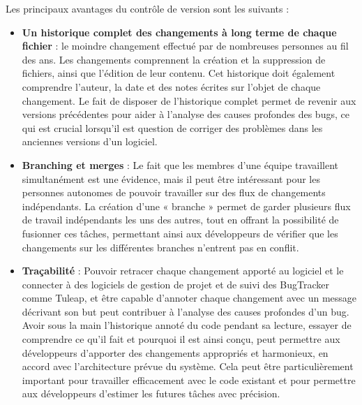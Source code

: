 Les principaux avantages du contrôle de version sont les suivants :
\begin{itemize}
   \item \textbf{Un historique complet des changements à long terme de chaque fichier} : le moindre changement effectué par de nombreuses personnes au fil des ans. Les changements comprennent la création et la suppression de fichiers, ainsi que l'édition de leur contenu. Cet historique doit également comprendre l'auteur, la date et des notes écrites sur l'objet de chaque changement. Le fait de disposer de l'historique complet permet de revenir aux versions précédentes pour aider à l'analyse des causes profondes des bugs, ce qui est crucial lorsqu'il est question de corriger des problèmes dans les anciennes versions d'un logiciel.
   \item \textbf{Branching et merges} : Le fait que les membres d'une équipe travaillent simultanément est une évidence, mais il peut être intéressant pour les personnes autonomes de pouvoir travailler sur des flux de changements indépendants. La création d'une « branche »  permet de garder plusieurs flux de travail indépendants les uns des autres, tout en offrant la possibilité de fusionner ces tâches, permettant ainsi aux développeurs de vérifier que les changements sur les différentes branches n'entrent pas en conflit.
   \item \textbf{Traçabilité} : Pouvoir retracer chaque changement apporté au logiciel et le connecter à des logiciels de gestion de projet et de suivi des BugTracker comme Tuleap, et être capable d'annoter chaque changement avec un message décrivant son but peut contribuer à l'analyse des causes profondes d'un bug. Avoir sous la main l'historique annoté du code pendant sa lecture, essayer de comprendre ce qu'il fait et pourquoi il est ainsi conçu, peut permettre aux développeurs d'apporter des changements appropriés et harmonieux, en accord avec l'architecture prévue du système. Cela peut être particulièrement important pour travailler efficacement avec le code existant et pour permettre aux développeurs d'estimer les futures tâches avec précision.
\end{itemize}
